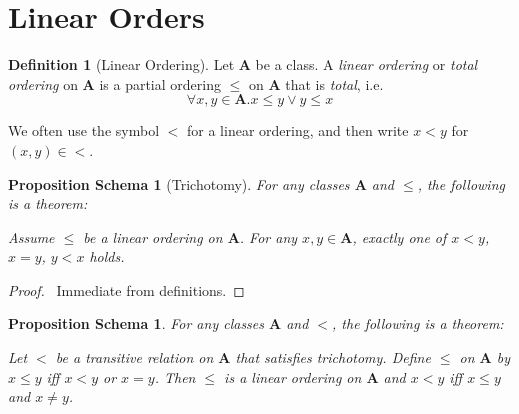 \documentclass{book}
\let\qed\relax
\newtheorem{props}[ax]{Proposition Schema}
\theoremstyle{definition}
\newtheorem{df}[ax]{Definition}
\begin{document}
\section{Linear Orders}

\begin{df}[Linear Ordering]
Let $\mathbf{A}$ be a class. A \emph{linear ordering} or \emph{total ordering} on $\mathbf{A}$ is a partial ordering $\leq$ on $\mathbf{A}$ that is \emph{total}, i.e.
\[ \forall x,y \in \mathbf{A}. x \leq y \vee y \leq x \]

We often use the symbol $<$ for a linear ordering, and then write $x < y$ for $(x,y) \in <$.
\end{df}

\begin{props}[Trichotomy]
For any classes $\mathbf{A}$ and $\leq$, the following is a theorem:

Assume $\leq$ be a linear ordering on $\mathbf{A}$. For any $x,y \in \mathbf{A}$, exactly one of $x < y$, $x = y$, $y < x$ holds.
\end{props}

\begin{proof}
\pf\ Immediate from definitions. \qed
\end{proof}

\begin{props}
\label{prop:linord}
For any classes $\mathbf{A}$ and $<$, the following is a theorem:

Let $<$ be a transitive relation on $\mathbf{A}$ that satisfies trichotomy. Define $\leq$ on $\mathbf{A}$ by $x \leq y$ iff $x < y$ or $x = y$. Then $\leq$ is a linear ordering on $\mathbf{A}$ and $x < y$ iff $x \leq y$ and $x \neq y$.
\end{props}
\end{document}
